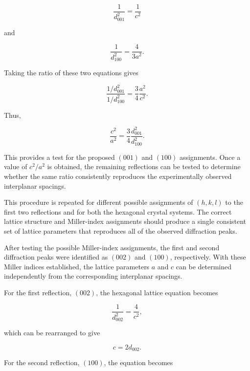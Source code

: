 \documentclass[12pt]{article}
\begin{document}
\begin{equation}
\frac{1}{d_{001}^2}=\frac{1}{c^2}
\end{equation}

and

\begin{equation}
\frac{1}{d_{100}^2}=\frac{4}{3a^2}.
\end{equation}

Taking the ratio of these two equations gives

\begin{equation}
\frac{1/d_{001}^2}{1/d_{100}^2} = \frac{3}{4}\frac{a^2}{c^2}.
\end{equation}

Thus,

\begin{equation}
\frac{c^2}{a^2} = \frac{3}{4}\frac{d_{001}^2}{d_{100}^2}.
\end{equation}

This provides a test for the proposed $(001)$ and $(100)$ assignments. Once a value of $c^2/a^2$ is obtained, the remaining reflections can be tested to determine whether the same ratio consistently reproduces the experimentally observed interplanar spacings.

This procedure is repeated for different possible assignments of $(h,k,l)$ to the first two reflections and for both the hexagonal crystal systems. The correct lattice structure and Miller-index assignments should produce a single consistent set of lattice parameters that reproduces all of the observed diffraction peaks.

After testing the possible Miller-index assignments, the first and second diffraction peaks were identified as $(002)$ and $(100)$, respectively. With these Miller indices established, the lattice parameters $a$ and $c$ can be determined independently from the corresponding interplanar spacings.

For the first reflection, $(002)$, the hexagonal lattice equation becomes

\begin{equation}
\frac{1}{d_{002}^2} = \frac{4}{c^2},
\end{equation}

which can be rearranged to give

\begin{equation}
c = 2d_{002}.
\end{equation}

For the second reflection, $(100)$, the equation becomes
\end{document}
